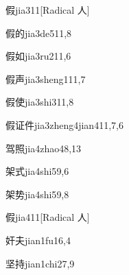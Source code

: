 \begin{verbete}{假}{jia3}{11}[Radical 人]
\end{verbete}

\begin{verbete}{假的}{jia3de5}{11,8}
\end{verbete}

\begin{verbete}{假如}{jia3ru2}{11,6}
\end{verbete}

\begin{verbete}{假声}{jia3sheng1}{11,7}
\end{verbete}

\begin{verbete}{假使}{jia3shi3}{11,8}
\end{verbete}

\begin{verbete}{假证件}{jia3zheng4jian4}{11,7,6}
\end{verbete}

\begin{verbete}{驾照}{jia4zhao4}{8,13}
\end{verbete}

\begin{verbete}{架式}{jia4shi5}{9,6}
\end{verbete}

\begin{verbete}{架势}{jia4shi5}{9,8}
\end{verbete}

\begin{verbete}{假}{jia4}{11}[Radical 人]
\end{verbete}

\begin{verbete}{奸夫}{jian1fu1}{6,4}
\end{verbete}

\begin{verbete}{坚持}{jian1chi2}{7,9}
\end{verbete}

